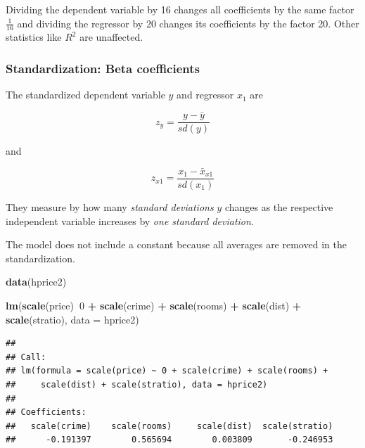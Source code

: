 \documentclass[]{book}
\newenvironment{Shaded}{\begin{snugshade}}{\end{snugshade}}
\newcommand{\DataTypeTok}[1]{\textcolor[rgb]{0.13,0.29,0.53}{#1}}
\newcommand{\DecValTok}[1]{\textcolor[rgb]{0.00,0.00,0.81}{#1}}
\newcommand{\KeywordTok}[1]{\textcolor[rgb]{0.13,0.29,0.53}{\textbf{#1}}}
\newcommand{\NormalTok}[1]{#1}
\newcommand{\OperatorTok}[1]{\textcolor[rgb]{0.81,0.36,0.00}{\textbf{#1}}}
\newcommand{\StringTok}[1]{\textcolor[rgb]{0.31,0.60,0.02}{#1}}
\begin{document}
Dividing the dependent variable by 16 changes all coefficients by the same factor \(\frac{1}{16}\) and dividing the regressor by 20 changes its coefficients by the factor 20. Other statistics like \(R^2\) are unaffected.

\hypertarget{standardization-beta-coefficients}{%
\subsubsection{Standardization: Beta coefficients}\label{standardization-beta-coefficients}}

The standardized dependent variable \(y\) and regressor \(x_1\) are

\begin{equation}
z_y=\frac{y-\bar{y}}{sd(y)}
\end{equation}

and

\begin{equation}
z_{x1}=\frac{x_{1}-\bar{x}_{x1}}{sd(x_{1})}
\end{equation}

They measure by how many \emph{standard deviations} \(y\) changes as the respective independent variable increases by \emph{one standard deviation}.

The model does not include a constant because all averages are removed in the standardization.

\begin{Shaded}
\begin{Highlighting}[]
\KeywordTok{data}\NormalTok{(hprice2)}
\end{Highlighting}
\end{Shaded}

\begin{Shaded}
\begin{Highlighting}[]
\KeywordTok{lm}\NormalTok{(}\KeywordTok{scale}\NormalTok{(price)}\OperatorTok{~}\DecValTok{0} \OperatorTok{+}\StringTok{  }\KeywordTok{scale}\NormalTok{(crime) }\OperatorTok{+}\StringTok{  }\KeywordTok{scale}\NormalTok{(rooms) }\OperatorTok{+}\StringTok{ }\KeywordTok{scale}\NormalTok{(dist) }\OperatorTok{+}\StringTok{  }\KeywordTok{scale}\NormalTok{(stratio), }\DataTypeTok{data =}\NormalTok{ hprice2)}
\end{Highlighting}
\end{Shaded}

\begin{verbatim}
## 
## Call:
## lm(formula = scale(price) ~ 0 + scale(crime) + scale(rooms) + 
##     scale(dist) + scale(stratio), data = hprice2)
## 
## Coefficients:
##   scale(crime)    scale(rooms)     scale(dist)  scale(stratio)  
##      -0.191397        0.565694        0.003809       -0.246953
\end{verbatim}
\end{document}
